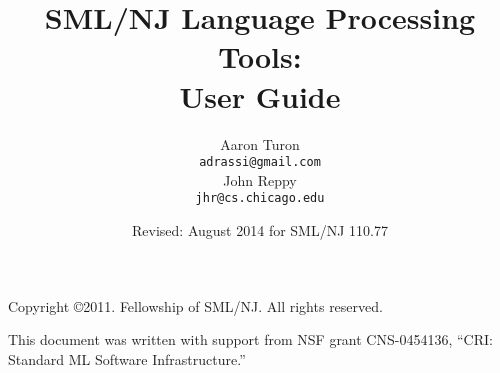 \documentclass[11pt,letterpaper]{book}
\title{
  SML/NJ Language Processing Tools:\\
  User Guide}
\author{
  Aaron Turon\\
  \texttt{adrassi@gmail.com}\\[0.5em]
  John Reppy\\
  \texttt{jhr@cs.chicago.edu}}
\date{Revised: August 2014 for SML/NJ 110.77}
\begin{document}
\frontmatter

	\maketitle
	
	\phantom{.}
	
	\noindent Copyright \copyright{}2011.  Fellowship of SML/NJ.  All rights reserved.
	
	\vskip 12pt
	\noindent This document was written with support from NSF grant CNS-0454136, ``CRI: Standard ML Software Infrastructure.''
	
	\pagebreak
	
	\tableofcontents

\mainmatter


	
	\newpage

	
	

	
		
		
		
		
		
	
%	
%		
%		


%		
%		


%	
%	
\end{document}
